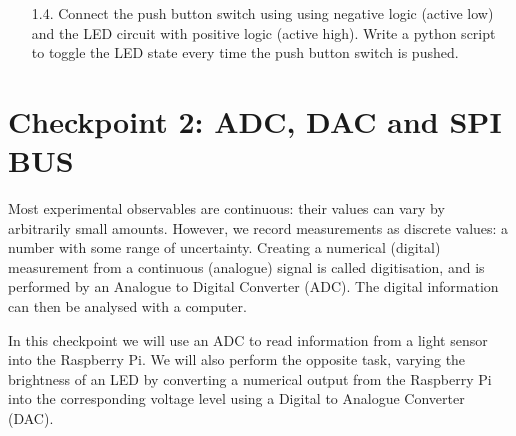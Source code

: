 \begin{enumerate}



\item [1.4.] Connect the push button switch using using negative logic (active low) and the LED circuit with positive logic (active high).
Write a python script to toggle the LED state every time the push button switch is pushed. \\




\end{enumerate}



\newpage
\section{Checkpoint 2: ADC, DAC and SPI BUS}

Most experimental observables are continuous: their values can vary by arbitrarily small amounts.
However, we record measurements as discrete values: a number with some range of uncertainty.
Creating a numerical (digital) measurement from a continuous (analogue) signal is called digitisation, and is performed by an Analogue to Digital Converter (ADC).
The digital information can then be analysed with a computer.

In this checkpoint we will use an ADC to read information from a light sensor into the Raspberry Pi.
We will also perform the opposite task, varying the brightness of an LED by converting a numerical output from the Raspberry Pi into the corresponding voltage level using a Digital to Analogue Converter (DAC).

